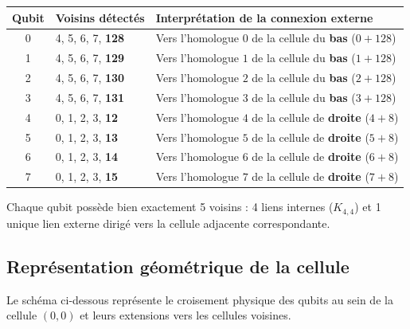 \documentclass{ceri/sty/rapport}
\begin{document}
\begin{solution}
\begin{center}
\renewcommand{\arraystretch}{1.3}
\begin{tabular}{cll}
\hline
\textbf{Qubit} & \textbf{Voisins détectés} & \textbf{Interprétation de la connexion externe} \\
\hline
0 & 4, 5, 6, 7, \textbf{128} & Vers l'homologue $0$ de la cellule du \textbf{bas} ($0 + 128$) \\
1 & 4, 5, 6, 7, \textbf{129} & Vers l'homologue $1$ de la cellule du \textbf{bas} ($1 + 128$) \\
2 & 4, 5, 6, 7, \textbf{130} & Vers l'homologue $2$ de la cellule du \textbf{bas} ($2 + 128$) \\
3 & 4, 5, 6, 7, \textbf{131} & Vers l'homologue $3$ de la cellule du \textbf{bas} ($3 + 128$) \\
4 & 0, 1, 2, 3, \textbf{12}  & Vers l'homologue $4$ de la cellule de \textbf{droite} ($4 + 8$) \\
5 & 0, 1, 2, 3, \textbf{13}  & Vers l'homologue $5$ de la cellule de \textbf{droite} ($5 + 8$) \\
6 & 0, 1, 2, 3, \textbf{14}  & Vers l'homologue $6$ de la cellule de \textbf{droite} ($6 + 8$) \\
7 & 0, 1, 2, 3, \textbf{15}  & Vers l'homologue $7$ de la cellule de \textbf{droite} ($7 + 8$) \\
\hline
\end{tabular}
\end{center}

Chaque qubit possède bien exactement 5 voisins : 4 liens internes ($K_{4,4}$) et 1 unique lien externe dirigé vers la cellule adjacente correspondante.

\subsection*{Représentation géométrique de la cellule}

Le schéma ci-dessous représente le croisement physique des qubits au sein de la cellule $(0,0)$ et leurs extensions vers les cellules voisines.

\begin{center}
\end{center}
\end{solution}
\end{document}
